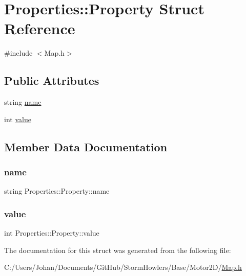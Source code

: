 \hypertarget{struct_properties_1_1_property}{}\section{Properties\+::Property Struct Reference}
\label{struct_properties_1_1_property}


{\ttfamily \#include $<$Map.\+h$>$}

\subsection*{Public Attributes}
\begin{DoxyCompactItemize}
\item 
string \mbox{\hyperlink{struct_properties_1_1_property_aa6f9cc48a78314be877afb455baddd01}{name}}
\item 
int \mbox{\hyperlink{struct_properties_1_1_property_a6ba7b826f3e66ed7a3fad097570a9d6d}{value}}
\end{DoxyCompactItemize}


\subsection{Member Data Documentation}
\mbox{\label{struct_properties_1_1_property_aa6f9cc48a78314be877afb455baddd01}} 
\subsubsection{\texorpdfstring{name}{name}}
{\footnotesize\ttfamily string Properties\+::\+Property\+::name}

\mbox{\label{struct_properties_1_1_property_a6ba7b826f3e66ed7a3fad097570a9d6d}} 
\subsubsection{\texorpdfstring{value}{value}}
{\footnotesize\ttfamily int Properties\+::\+Property\+::value}



The documentation for this struct was generated from the following file\+:\begin{DoxyCompactItemize}
\item 
C\+:/\+Users/\+Johan/\+Documents/\+Git\+Hub/\+Storm\+Howlers/\+Base/\+Motor2\+D/\mbox{\hyperlink{_map_8h}{Map.\+h}}\end{DoxyCompactItemize}
